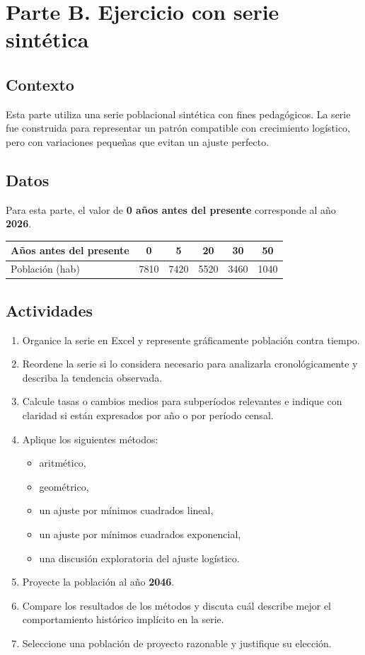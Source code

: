 \documentclass[12pt]{article}
\begin{document}
\section{Parte B. Ejercicio con serie sintética}
\subsection{Contexto}
Esta parte utiliza una serie poblacional sintética con fines pedagógicos. La serie fue construida para representar un patrón compatible con crecimiento logístico, pero con variaciones pequeñas que evitan un ajuste perfecto.

\subsection{Datos}
Para esta parte, el valor de \textbf{0 años antes del presente} corresponde al año \textbf{2026}.

\begin{center}
\begin{tabular}{lccccc}
\toprule
Años antes del presente & 0 & 5 & 20 & 30 & 50 \\
\midrule
Población (hab) & \num{7810} & \num{7420} & \num{5520} & \num{3460} & \num{1040} \\
\bottomrule
\end{tabular}
\end{center}

\subsection{Actividades}
\begin{enumerate}
\item Organice la serie en Excel y represente gráficamente población contra tiempo.
\item Reordene la serie si lo considera necesario para analizarla cronológicamente y describa la tendencia observada.
\item Calcule tasas o cambios medios para subperíodos relevantes e indique con claridad si están expresados por año o por período censal.
\item Aplique los siguientes métodos:
\begin{itemize}
\item aritmético,
\item geométrico,
\item un ajuste por mínimos cuadrados lineal,
\item un ajuste por mínimos cuadrados exponencial,
\item una discusión exploratoria del ajuste logístico.
\end{itemize}
\item Proyecte la población al año \textbf{2046}.
\item Compare los resultados de los métodos y discuta cuál describe mejor el comportamiento histórico implícito en la serie.
\item Seleccione una población de proyecto razonable y justifique su elección.
\end{enumerate}
\end{document}
